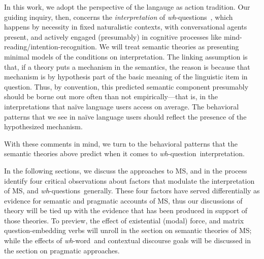 \documentclass[12pt,letterpaper,table,svgnames,dvipsnames]{article}
\newcommand{\mm}[1]{\textcolor{teal}{[mm: #1]}}
\newcommand{\whq}{\emph{wh}-question~}
\newcommand{\whqs}{\emph{wh}-questions~}
\newcommand{\whw}{\emph{wh}-word~}
\begin{document}
In this work, we adopt the perspective of the langauge as action tradition. Our guiding inquiry, then, concerns the \emph{interpretation} of \whqs, which happens by necessity in fixed naturalistic contexts, with conversational agents present, and actively engaged (presumably) in cognitive processes like mind-reading/intention-recognition. We will treat semantic theories as presenting minimal models of the conditions on interpretation. The linking assumption is that, if a theory puts a mechanism in the semantics, the reason is because that mechanism is by hypothesis part of the basic meaning of the linguistic item in question. Thus, by convention, this predicted semantic component presumably should be borne out more often than not empirically---that is, in the interpretations that na\"ive language users access on average. The behavioral patterns that we see in na\"ive language users should reflect the presence of the hypothesized mechanism.

With these comments in mind, we turn to the behavioral patterns that the semantic theories above predict when it comes to \whq interpretation. 

In the following sections, we discuss the approaches to MS, and in the process identify four critical observations about factors that modulate the interpretation of MS, and \whqs generally. These four factors have served differentially as evidence for semantic and pragmatic accounts of MS, thus our discussions of theory will be tied up with the evidence that has been produced in support of those theories. To preview, the effect of existential (modal) force, and matrix question-embedding verbs will unroll in the section on semantic theories of MS; while the effects of \whw and contextual discourse goals will be discussed in the section on pragmatic approaches. 



\end{document}
